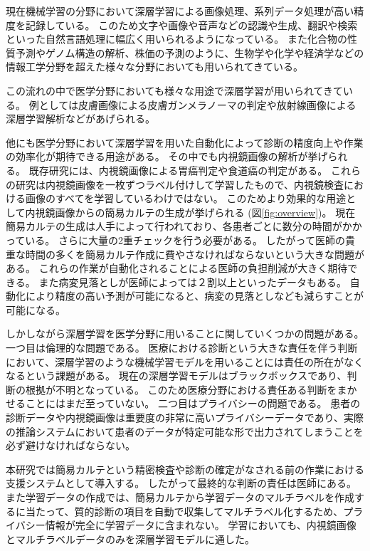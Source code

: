 現在機械学習の分野において深層学習による画像処理\cite{CNN,AlexNet,VGG,ResNet}、系列データ処理\cite{RNN,GRU,LSTM,Transformer}が高い精度を記録している。
このため文字や画像や音声などの認識\cite{DL_LVCSR,ImageNet}や生成\cite{GAN,VAE}、翻訳\cite{Transformer,Seq2Seq,effective_attention}や検索\cite{anxious_learning}といった自然言語処理に幅広く用いられるようになっている。
また化合物の性質予測\cite{Chemistry1,Chemistry2}やゲノム構造の解析\cite{Genomics}、株価の予測\cite{stock_prediction1,stock_prediction2}のように、生物学や化学や経済学などの情報工学分野を超えた様々な分野においても用いられてきている。

この流れの中で医学分野においても様々な用途で深層学習が用いられてきている。
例としては皮膚画像による皮膚ガンメラノーマの判定\cite{skin_cancer_melanoma}や放射線画像による深層学習解析\cite{radiology}などがあげられる。

他にも医学分野において深層学習を用いた自動化によって診断の精度向上や作業の効率化が期待できる用途がある。
その中でも内視鏡画像の解析が挙げられる。
既存研究には、内視鏡画像による胃癌判定\cite{stomach_cancer}や食道癌\cite{esophageal_cancer}の判定がある。
これらの研究は内視鏡画像を一枚ずつラベル付けして学習したもので、内視鏡検査における画像のすべてを学習しているわけではない。
このためより効果的な用途として内視鏡画像からの簡易カルテの生成が挙げられる (図\ref{fig:overview})。
現在簡易カルテの生成は人手によって行われており、各患者ごとに数分の時間がかかっている。
さらに大量の2重チェックを行う必要がある。
したがって医師の貴重な時間の多くを簡易カルテ作成に費やさなければならないという大きな問題がある。
これらの作業が自動化されることによる医師の負担削減が大きく期待できる。
また病変見落としが医師によっては２割以上といったデータ\cite{medical_problem2}もある。
自動化により精度の高い予測が可能になると、病変の見落としなども減らすことが可能になる。

しかしながら深層学習を医学分野に用いることに関していくつかの問題がある。
一つ目は倫理的な問題である。
医療における診断という大きな責任を伴う判断において、深層学習のような機械学習モデルを用いることには責任の所在がなくなるという課題がある。
現在の深層学習モデルはブラックボックスであり、判断の根拠が不明となっている。
このため医療分野における責任ある判断をまかせることにはまだ至っていない。
二つ目はプライバシーの問題である。
患者の診断データや内視鏡画像は重要度の非常に高いプライバシーデータであり、実際の推論システムにおいて患者のデータが特定可能な形で出力されてしまうことを必ず避けなければならない。

本研究では簡易カルテという精密検査や診断の確定がなされる前の作業における支援システムとして導入する。
したがって最終的な判断の責任は医師にある。
また学習データの作成では、簡易カルテから学習データのマルチラベルを作成するに当たって、質的診断の項目を自動で収集してマルチラベル化するため、プライバシー情報が完全に学習データに含まれない。
学習においても、内視鏡画像とマルチラベルデータのみを深層学習モデルに通した。

